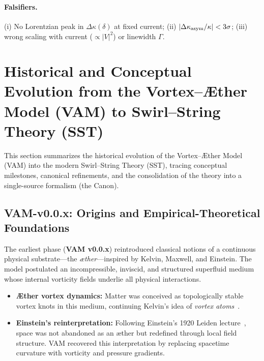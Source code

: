 \documentclass[10pt,reprint,aps,onecolumn,nofootinbib]{revtex4-2}
\begin{document}
    \paragraph{Falsifiers.} (i) No Lorentzian peak in $\Delta\kappa(\delta)$ at fixed current; (ii) $|\Delta\kappa_{\rm asym}/\kappa|<3\sigma$; (iii) wrong scaling with current ($\propto |V|^2$) or linewidth $\Gamma$.


    \section{Historical and Conceptual Evolution from the Vortex--Æther Model (VAM) to Swirl--String Theory (SST)}
    \label{sec:HistoryEvolution}


    \begin{tcolorbox}[colback=gray!5,colframe=black,title={Canonical Context}]
    This section summarizes the historical evolution of the Vortex--Æther Model (VAM) into the modern Swirl--String Theory (SST), tracing conceptual milestones, canonical refinements, and the consolidation of the theory into a single-source formalism (the Canon).
    \end{tcolorbox}

    \subsection{VAM-v0.0.x: Origins and Empirical-Theoretical Foundations}

        The earliest phase (\textbf{VAM v0.0.x}) reintroduced classical notions of a continuous physical substrate---the \emph{æther}---inspired by Kelvin, Maxwell, and Einstein.
        The model postulated an incompressible, inviscid, and structured superfluid medium whose internal vorticity fields underlie all physical interactions.

        \begin{itemize}
        \item \textbf{Æther vortex dynamics:} Matter was conceived as topologically stable vortex knots in this medium, continuing Kelvin's idea of \emph{vortex atoms}~\cite{Kelvin1867}.
        \item \textbf{Einstein's reinterpretation:} Following Einstein's 1920 Leiden lecture~\cite{Einstein1920}, space was not abandoned as an æther but redefined through local field structure. VAM recovered this interpretation by replacing spacetime curvature with vorticity and pressure gradients.
        \end{itemize}
\end{document}
